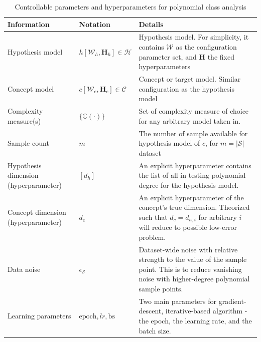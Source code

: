 \documentclass[10pt]{article} %
\begin{document}
\begin{table}[htb]
  \centering
  \footnotesize
  \begin{threeparttable}
    \caption{Controllable parameters and hyperparameters for polynomial class analysis}
    \label{tab:polynomial_test}
    \begin{tabularx}{\textwidth}{@{} L{0.25\textwidth}
                                     L{0.2\textwidth}
                                     >{\RaggedRight\arraybackslash}X @{}}
      \toprule
      \textbf{Information} & \textbf{Notation} & \textbf{Details} \\
      \midrule
      Hypothesis model
        & $h[\mathcal{W}_{h},\mathbf{H}_{h}]\in \mathcal{H}$
        & Hypothesis model. For simplicity, it contains $\mathcal{W}$ as the configuration parameter set, and $\mathbf{H}$ the fixed hyperparameters \\
      \addlinespace[1pt]
      Concept model
        & $c[\mathcal{W}_{c},\mathbf{H}_{c}]\in \mathcal{C}$
        & Concept or target model. Similar configuration as the hypothesis model \\
      \addlinespace[1pt]
      Complexity measure(s)
        & $\{\mathbb{C}(\cdot)\}$
        & Set of complexity measure of choice for any arbitrary model taken in. \\
      \addlinespace[1pt]
      Sample count
        & $m$
        & The number of sample available for hypothesis model of $c$, for $m=|\mathcal{S}|$ dataset\\
      \addlinespace[1pt]
      Hypothesis dimension (hyperparameter)
        & $[d_{h}]$
        & An explicit hyperparameter contains the list of all in-testing polynomial degree for the hypothesis model. \\
      \addlinespace[1pt]
      Concept dimension (hyperparameter)
        & $d_{c}$
        & An explicit hyperparameter of the concept's true dimension. Theorized such that $d_{c}=d_{h,i}$ for arbitrary $i$ will reduce to possible low-error problem.\\
      \addlinespace[1pt]
      Data noise
        & $\epsilon_{\mathcal{S}}$
        & Dataset-wide noise with relative strength to the value of the sample point. This is to reduce vanishing noise with higher-degree polynomial sample points. \\
      \addlinespace[1pt]
      Learning parameters
        & $\mathrm{epoch}, lr, \mathrm{bs}$
        & Two main parameters for gradient-descent, iterative-based algorithm - the epoch, the learning rate, and the batch size.\\
      \bottomrule
    \end{tabularx}


\end{threeparttable}
\end{table}
\end{document}
